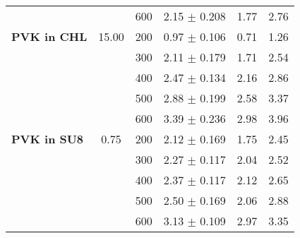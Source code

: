 \begin{table}[!th]
\begin{xltabular}{\textwidth}{Xccccc}
{}                          & {}    & 600 & 2.15 $\pm$ 0.208 & 1.77 & 2.76 \\
\textbf{PVK in CHL}         & 15.00 & 200 & 0.97 $\pm$ 0.106 & 0.71 & 1.26 \\
{}                          & {}    & 300 & 2.11 $\pm$ 0.179 & 1.71 & 2.54 \\
{}                          & {}    & 400 & 2.47 $\pm$ 0.134 & 2.16 & 2.86 \\
{}                          & {}    & 500 & 2.88 $\pm$ 0.199 & 2.58 & 3.37 \\
{}                          & {}    & 600 & 3.39 $\pm$ 0.236 & 2.98 & 3.96 \\
\textbf{PVK in SU8}         & 0.75  & 200 & 2.12 $\pm$ 0.169 & 1.75 & 2.45 \\
{}                          & {}    & 300 & 2.27 $\pm$ 0.117 & 2.04 & 2.52 \\
{}                          & {}    & 400 & 2.37 $\pm$ 0.117 & 2.12 & 2.65 \\
{}                          & {}    & 500 & 2.50 $\pm$ 0.169 & 2.06 & 2.88 \\
{}                          & {}    & 600 & 3.13 $\pm$ 0.109 & 2.97 & 3.35 \\
\hline
\end{xltabular}
\label{tab:PEOinSU8}
\end{table}